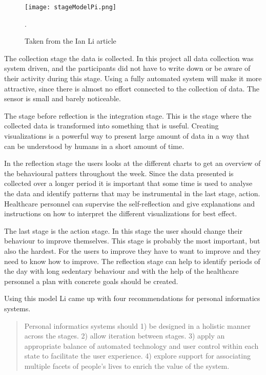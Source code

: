 \begin{figure}[h!]
	\centering
		\texttt{[image: stageModelPi.png]}
		\caption{\footnotesize Taken from the Ian Li article \cite{li2010}}.
		\label{fig:stageModelPi}
\end{figure}

The collection stage the data is collected. In this project all data collection was system driven, and the participants did not have to write down or be aware of their activity during this stage. Using a fully automated system will make it more attractive, since there is almost no effort connected to the collection of data. The sensor is small and barely noticeable.

The stage before reflection is the integration stage. This is the stage where the collected data is transformed into something that is useful. Creating visualizations is a powerful way to present large amount of data in a way that can be understood by humans in a short amount of time. 

In the reflection stage the users looks at the different charts to get an overview of the behavioural patters throughout the week. Since the data presented is collected over a longer period it is important that some time is used to analyse the data and identify patterns that may be instrumental in the last stage, action. Healthcare personnel can supervise the self-reflection and give explanations and instructions on how to interpret the different visualizations for best effect.

The last stage is the action stage. In this stage the user should change their behaviour to improve themselves. This stage is probably the most important, but also the hardest. For the users to improve they have to want to improve and they need to know how to improve. The reflection stage can help to identify periods of the day with long sedentary behaviour and with the help of the healthcare personnel a plan with concrete goals should be created. 


Using this model Li %
came up with four recommendations for personal informatics systems. 
\begin{quote}
	Personal informatics systems should
	1) be designed in a holistic manner across the stages.
	2) allow iteration between stages.
	3) apply an appropriate balance of automated technology and user control within each state to facilitate the user experience.
	4) explore support for associating multiple facets of people's lives to enrich the value of the system.
\end{quote}


